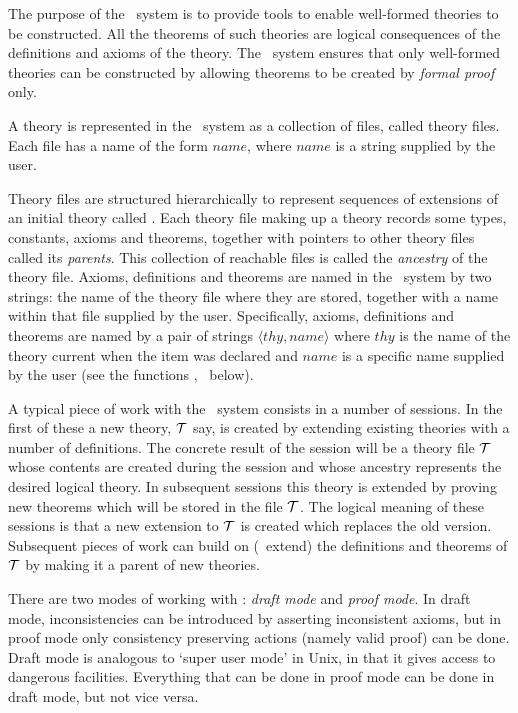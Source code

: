 The purpose of the \HOL\ system is to provide tools to enable
well-formed theories to be constructed.  All the theorems of such
theories are logical consequences of the definitions and axioms of the
theory.  The \HOL\ system ensures that only well-formed theories can
be constructed by allowing theorems to be created by {\it formal
  proof\/} only.

A theory is represented in the \HOL\ system as a collection of files,
called theory files.  Each file has a name of the form $name$,
where $name$ is a string supplied by the user.

Theory files are structured hierarchically to represent sequences of
extensions of an initial theory called .  Each theory file
making up a theory records some types, constants, axioms and theorems,
together with pointers to other theory files called its {\it
  parents\/}.  This collection of reachable files is called the {\it
  ancestry\/} of the theory file. Axioms, definitions and theorems are
named in the \HOL\ system by two strings: the name of the theory file
where they are stored, together with a name within that file supplied
by the user.  Specifically, axioms, definitions and theorems are named
by a pair of strings $\langle thy,name\rangle$ where $thy$ is the name
of the theory current when the item was declared and $name$ is a
specific name supplied by the user (see the functions ,
 \etc\ below).

A typical piece of work with the \HOL\ system consists in a number of
sessions. In the first of these a new theory, ${\cal T}$ say, is
created by extending existing theories with a number of definitions.
The concrete result of the session will be a theory file ${\cal
  T}$ whose contents are created during the session and whose
ancestry represents the desired logical theory.  In subsequent
sessions this theory is extended by proving new theorems which will be
stored in the file ${\cal T}$. The logical meaning of these
sessions is that a new extension to ${\cal T}$ is created which
replaces the old version.  Subsequent pieces of work can build on
(\ie\ extend) the definitions and theorems of ${\cal T}$ by making it
a parent of new theories.

There are two modes of working with \HOL: {\it draft mode\/} and {\it
  proof mode\/}.  In draft mode, inconsistencies can be introduced by
asserting inconsistent axioms, but in proof mode only consistency
preserving actions (namely valid proof) can be done.  Draft mode is
analogous to `super user mode' in Unix, in that it gives access to
dangerous facilities.  Everything that can be done in proof mode can
be done in draft mode, but not vice versa.

